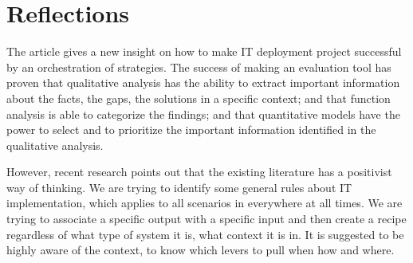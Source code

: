 
\section{Reflections}

The article gives a new insight on how to make IT deployment project successful by an orchestration of strategies. The success of making an evaluation tool has proven that qualitative analysis has the ability to extract important information about the facts, the gaps, the solutions in a specific context; and that function analysis is able to categorize the findings; and that quantitative models have the power to select and to prioritize the important information identified in the qualitative analysis.

However, recent research points out that the existing literature has a positivist way of thinking. We are trying to identify some general rules about IT implementation, which applies to all scenarios in everywhere at all times. We are trying to associate a specific output with a specific input and then create a recipe regardless of what type of system it is, what context it is in. It is suggested to be highly aware of the context, to know which levers to pull when how and where\parencite{6}.

